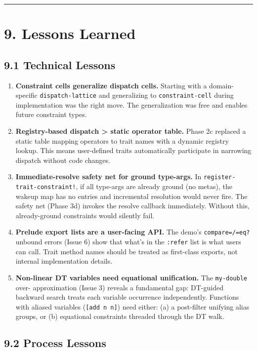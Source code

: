 \documentclass[11pt]{article}
\begin{document}
\noindent\rule{\textwidth}{0.5pt}
\section{9. Lessons Learned}
\label{sec:orge6dc16b}

\subsection{9.1 Technical Lessons}
\label{sec:orgd9fe86f}

\begin{enumerate}
\item \textbf{Constraint cells generalize dispatch cells.} Starting with a domain-specific
\texttt{dispatch-lattice} and generalizing to \texttt{constraint-cell} during implementation
was the right move. The generalization was free and enables future constraint types.

\item \textbf{Registry-based dispatch > static operator table.} Phase 2c replaced a static table
mapping operators to trait names with a dynamic registry lookup. This means
user-defined traits automatically participate in narrowing dispatch without
code changes.

\item \textbf{Immediate-resolve safety net for ground type-args.} In \texttt{register-trait-constraint!},
if all type-args are already ground (no metas), the wakeup map has no entries and
incremental resolution would never fire. The safety net (Phase 3d) invokes the
resolve callback immediately. Without this, already-ground constraints would silently
fail.

\item \textbf{Prelude export lists are a user-facing API.} The demo's \texttt{compare=/=eq?} unbound
errors (Issue 6) show that what's in the \texttt{:refer} list is what users can call.
Trait method names should be treated as first-class exports, not internal
implementation details.

\item \textbf{Non-linear DT variables need equational unification.} The \texttt{my-double} over-
approximation (Issue 3) reveals a fundamental gap: DT-guided backward search
treats each variable occurrence independently. Functions with aliased variables
(\texttt{[add n n]}) need either: (a) a post-filter unifying alias groups, or (b)
equational constraints threaded through the DT walk.
\end{enumerate}
\subsection{9.2 Process Lessons}
\label{sec:orge8620d2}
\end{document}
